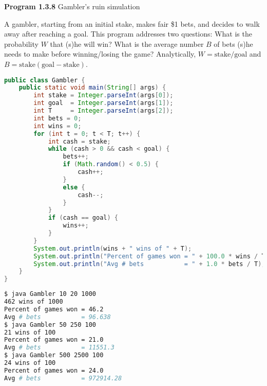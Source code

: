\documentclass[8pt,a4paper,compress]{beamer}
\begin{document}
\begin{frame}[fragile]
\pause

\textbf{Program 1.3.8} Gambler's ruin simulation

\begin{framed}
\tiny A gambler, starting from an initial stake, makes fair \$1 bets, and decides to walk away after reaching a goal. This program addresses two questions: What is the probability $W$ that (s)he will win? What is the average number $B$ of bets (s)he needs to make before winning/losing the game? Analytically, $W=\text{stake}/\text{goal}$ and $B=\text{stake}(\text{goal}-\text{stake})$.
\end{framed}

\begin{lstlisting}[language=Java]
public class Gambler { 
    public static void main(String[] args) {
        int stake = Integer.parseInt(args[0]);
        int goal  = Integer.parseInt(args[1]); 
        int T     = Integer.parseInt(args[2]); 
        int bets = 0; 
        int wins = 0; 
        for (int t = 0; t < T; t++) {
            int cash = stake;
            while (cash > 0 && cash < goal) {
                bets++;
                if (Math.random() < 0.5) {
                    cash++;
                }
                else {                     
                    cash--;
                }
            }
            if (cash == goal) {
                wins++;
            }
        }
        System.out.println(wins + " wins of " + T);
        System.out.println("Percent of games won = " + 100.0 * wins / T);
        System.out.println("Avg # bets           = " + 1.0 * bets / T);
    }
}
\end{lstlisting}
\end{frame}

\begin{frame}[fragile]
\pause

\begin{lstlisting}[language=Bash]
$ java Gambler 10 20 1000
462 wins of 1000
Percent of games won = 46.2
Avg # bets           = 96.638
$ java Gambler 50 250 100
21 wins of 100
Percent of games won = 21.0
Avg # bets           = 11551.3
$ java Gambler 500 2500 100
24 wins of 100
Percent of games won = 24.0
Avg # bets           = 972914.28
\end{lstlisting}
\end{frame}
\end{document}
